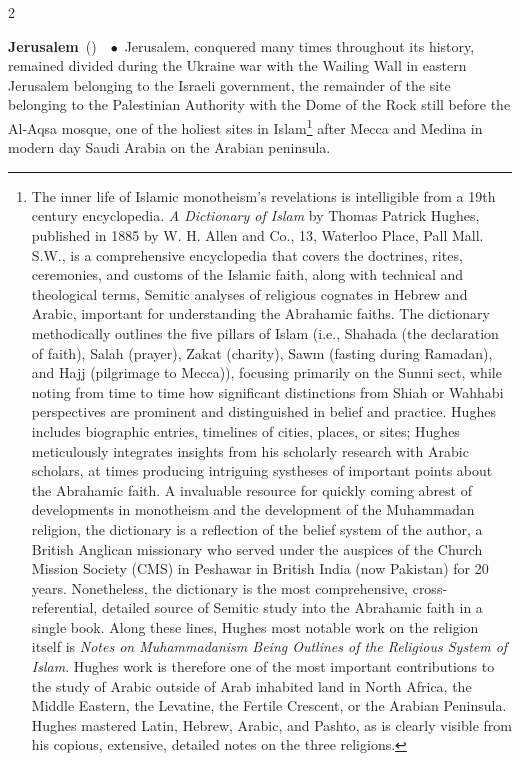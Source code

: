 \documentclass[10pt,a4paper,twoside]{article} %
\newcommand{\entry}[4]{\markboth{#1}{#1}\textbf{#1}\ {(#2)}\ \textit{#3}\ $\bullet$\ {#4}}  %
\begin{document}
\begin{multicols}{2}
\entry{Jerusalem} {} {} {Jerusalem, conquered many times throughout its history, remained divided during the Ukraine war with the Wailing Wall in eastern Jerusalem belonging to the Israeli government, the remainder of the site belonging to the Palestinian Authority with the Dome of the Rock still before the Al-Aqsa mosque, one of the holiest sites in Islam\footnote{The inner life of Islamic monotheism's revelations is intelligible from a 19th century encyclopedia. \emph{A Dictionary of Islam} by Thomas Patrick Hughes, published in 1885 by W. H. Allen and Co., 13, Waterloo Place, Pall Mall. S.W., is a comprehensive encyclopedia that covers the doctrines, rites, ceremonies, and customs of the Islamic faith, along with technical and theological terms, Semitic analyses of religious cognates in Hebrew and Arabic, important for understanding the Abrahamic faiths. The dictionary methodically outlines the five pillars of Islam (i.e., Shahada (the declaration of faith), Salah (prayer), Zakat (charity), Sawm (fasting during Ramadan), and Hajj (pilgrimage to Mecca)), focusing primarily on the Sunni sect, while noting from time to time how significant distinctions from Shiah or Wahhabi perspectives are prominent and distinguished in belief and practice. Hughes includes biographic entries, timelines of cities, places, or sites; Hughes meticulously integrates insights from his scholarly research with Arabic scholars, at times producing intriguing systheses of important points about the Abrahamic faith. \newline \indent A invaluable resource for quickly coming abrest of developments in monotheism and the development of the Muhammadan religion, the dictionary is a reflection of the belief system of the author, a British Anglican missionary who served under the auspices of the Church Mission Society (CMS) in Peshawar in British India (now Pakistan) for 20 years. Nonetheless, the dictionary is the most comprehensive, cross-referential, detailed source of Semitic study into the Abrahamic faith in a single book. Along these lines, Hughes most notable work on the religion itself is \emph{Notes on Muhammadanism Being Outlines of the Religious System of Islam}. Hughes work is therefore one of the most important contributions to the study of Arabic outside of Arab inhabited land in North Africa, the Middle Eastern, the Levatine, the Fertile Crescent, or the Arabian Peninsula. Hughes mastered Latin, Hebrew, Arabic, and Pashto, as is clearly visible from his copious, extensive, detailed notes on the three religions.} after Mecca and Medina in modern day Saudi Arabia on the Arabian peninsula.}


\end{multicols}
\end{document}
